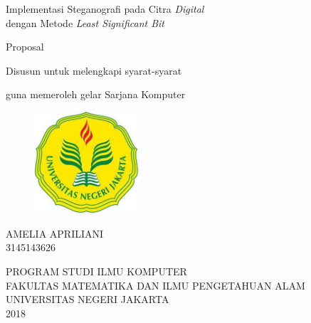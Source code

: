 \thispagestyle{empty}
\begin{center}
\large {Implementasi Steganografi pada Citra \emph{Digital} \\ dengan Metode \emph{Least Significant Bit}}
\end{center}
\bigskip
\vspace{2mm}


\begin{center}
\large{Proposal}

\large{Disusun untuk melengkapi syarat-syarat}

\large{guna memeroleh gelar Sarjana Komputer}

\end{center}


\vspace{5mm}

\begin{figure}[htbp]
\begin{center}
 \includegraphics[width=0.35\textwidth,]{gambar/unj.jpg}
       \end{center}
\end{figure}

\begin{center}
\large{AMELIA APRILIANI}\\
 \large{3145143626}
\end{center}

\vspace{20mm}

\begin{center}
{PROGRAM STUDI ILMU KOMPUTER\\
FAKULTAS MATEMATIKA DAN ILMU PENGETAHUAN ALAM \\
UNIVERSITAS NEGERI JAKARTA \\ 2018}
\end{center}
